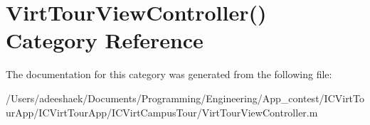 \hypertarget{category_virt_tour_view_controller_07_08}{\section{Virt\-Tour\-View\-Controller() Category Reference}
\label{category_virt_tour_view_controller_07_08}
}


The documentation for this category was generated from the following file\-:\begin{DoxyCompactItemize}
\item 
/\-Users/adeeshaek/\-Documents/\-Programming/\-Engineering/\-App\-\_\-contest/\-I\-C\-Virt\-Tour\-App/\-I\-C\-Virt\-Tour\-App/\-I\-C\-Virt\-Campus\-Tour/Virt\-Tour\-View\-Controller.\-m\end{DoxyCompactItemize}
